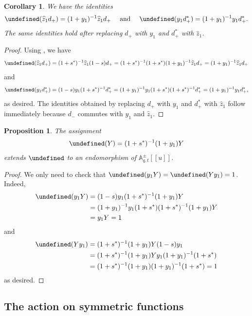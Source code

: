 \documentclass[reqno]{amsart}
\theoremstyle{plain}
\newtheorem{corollary}[theorem]{Corollary}
\newtheorem{proposition}[theorem]{Proposition}
\theoremstyle{definition}
\theoremstyle{remark}
\newcommand{\A}{\mathbb{A}}%
\newcommand{\z}{\widehat{z}}
\let\oldTheta\Theta
\let\Theta\undefined
\DeclareMathOperator{\Theta}{\oldTheta}
\newcommand{\<}{\langle}
\renewcommand{\>}{\rangle}
\begin{document}
\begin{corollary}
    \label{cor:theta_yz}
    We have the identities \[ \Theta(\z_1 d_+) = (1+y_1)^{-1} \z_1 d_+ \quad \text{ and } \quad \Theta(y_1 d_+^*) = (1+y_1)^{-1} y_1 d_+^*. \]
    The same identities hold after replacing $d_+$ with $y_1$ and $d_+^*$ with $\z_1$.
\end{corollary}

\begin{proof}
    Using , we have
    \[ \Theta(\z_1 d_+) = (1+s^*)^{-1} \z_1 (1-s) d_+ = (1+s^*)^{-1} (1 + s^*) (1 + y_1)^{-1} \z_1 d_+ = (1+y_1)^{-1} \z_1 d_+ \]
    and
    \[ \Theta(y_1 d_+^*) = (1-s) y_1 (1+s^*)^{-1} d_+^* = (1 + y_1)^{-1} y_1 (1 + s^*) (1+s^*)^{-1} d_+^* = (1+y_1)^{-1} y_1 d_+^*, \]
    as desired. The identities obtained by replacing $d_+$ with $y_1$ and $d_+^*$ with $\z_1$ follow immediately because $d_-$ commutes with $y_1$ and $\z_1$.
\end{proof}

\begin{proposition}
    The assignment
    \[ \Theta(Y) = (1+s^*)^{-1} (1+y_1) Y \]
    extends $\Theta$ to an endomorphism of $\A_{q,t}^\pm[[u]]$. 
\end{proposition}

\begin{proof}
    We only need to check that $\Theta(y_1 Y) = \Theta(Y y_1) = 1$. Indeed,
    \begin{align*}
        \Theta(y_1 Y) & = (1-s) y_1 (1+s^*)^{-1} (1+y_1) Y \\
        & = (1+y_1)^{-1} y_1 (1+s^*) (1+s^*)^{-1} (1+y_1) Y \\
        & = y_1 Y = 1 \\
    \end{align*}
    and
    \begin{align*}
        \Theta(Y y_1) & = (1+s^*)^{-1} (1+y_1) Y (1-s) y_1 \\
        & = (1+s^*)^{-1} (1+y_1) Y y_1 (1+y_1)^{-1} (1+s^*) \\
        & = (1+s^*)^{-1} (1+y_1) (1+y_1)^{-1} (1+s^*) = 1 \\
    \end{align*}
    as desired.    
\end{proof}

\subsection{The action on symmetric functions}
\end{document}
